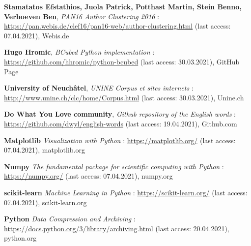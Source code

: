 \begin{thebibliography}{9}
\textbf{Stamatatos Efstathios, Juola Patrick, Potthast Martin, Stein Benno, Verhoeven Ben},
\textit{PAN16 Author Clustering 2016} : \url{https://pan.webis.de/clef16/pan16-web/author-clustering.html} (last access: 07.04.2021),
Webis.de

\textbf{Hugo Hromic},
\textit{BCubed Python implementation} : \url{https://github.com/hhromic/python-bcubed} (last access: 30.03.2021),
GitHub Page

\textbf{University of Neuchâtel},
\textit{UNINE Corpus et sites internets} : \url{http://www.unine.ch/clc/home/Corpus.html} (last access: 30.03.2021),
Unine.ch

\textbf{Do What You Love community},
\textit{Github repository of the English words} : \url{https://github.com/dwyl/english-words} (last access: 19.04.2021),
Github.com



\textbf{Matplotlib}
\textit{Visualization with Python} : \url{https://matplotlib.org/} (last access: 07.04.2021),
matplotlib.org

\textbf{Numpy}
\textit{The fundamental package for scientific computing with Python} : \url{https://numpy.org/} (last access: 07.04.2021),
numpy.org

\textbf{scikit-learn}
\textit{Machine Learning in Python} : \url{https://scikit-learn.org/} (last access: 07.04.2021),
scikit-learn.org

\textbf{Python}
\textit{Data Compression and Archiving} : \url{https://docs.python.org/3/library/archiving.html} (last access: 20.04.2021),
python.org

\end{thebibliography}

